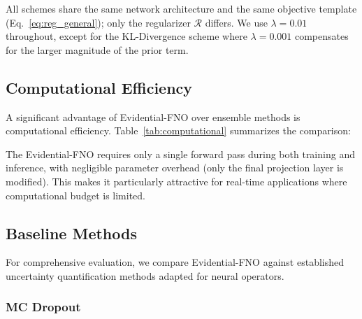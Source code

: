 All schemes share the same network architecture and the same objective template
(Eq.~\eqref{eq:reg_general}); only the regularizer $\mathcal{R}$ differs. We use $\lambda = 0.01$ throughout,
except for the KL-Divergence scheme where $\lambda = 0.001$ compensates for the larger magnitude of the prior
term.

\subsection{Computational Efficiency}

A significant advantage of Evidential-FNO over ensemble methods is computational efficiency. 
Table~\ref{tab:computational} summarizes the comparison:

\begin{table}[h]
\centering
\caption{Computational comparison of uncertainty quantification methods for FNO.}
\label{tab:computational}
\end{table}

The Evidential-FNO requires only a single forward pass during both training and inference, with negligible 
parameter overhead (only the final projection layer is modified). This makes it particularly attractive for 
real-time applications where computational budget is limited.

\subsection{Baseline Methods}

For comprehensive evaluation, we compare Evidential-FNO against established uncertainty quantification 
methods adapted for neural operators.

\subsubsection{MC Dropout}

